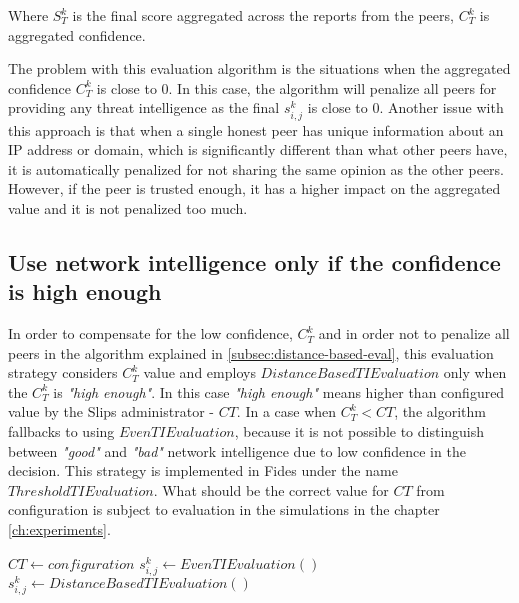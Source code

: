 Where $S^{k}_{T}$ is the final score aggregated across the reports from the peers, $C^{k}_{T}$ is aggregated confidence.

The problem with this evaluation algorithm is the situations when the aggregated confidence $C^{k}_{T}$ is close to $0$. In this case, the algorithm will penalize all peers for providing any threat intelligence as the final $s^{k}_{i, j}$ is close to $0$. Another issue with this approach is that when a single honest peer has unique information about an IP address or domain, which is significantly different than what other peers have, it is automatically penalized for not sharing the same opinion as the other peers. However, if the peer is trusted enough, it has a higher impact on the aggregated value and it is not penalized too much.

\subsection{Use network intelligence only if the confidence is high enough}
\label{subsec:network-intelligence-conf-high-enough}
In order to compensate for the low confidence, $C^{k}_{T}$ and in order not to penalize all peers in the algorithm explained in \ref{subsec:distance-based-eval}, this evaluation strategy considers $C^{k}_{T}$ value and employs  $DistanceBasedTIEvaluation$ only when the  $C^{k}_{T}$ is \textit{"high enough"}. In this case \textit{"high enough"} means higher than configured value by the Slips administrator - ${CT}$.
In a case when  $C^{k}_{T} < {CT}$, the algorithm fallbacks to using $EvenTIEvaluation$, because it is not possible to distinguish between \textit{"good"} and \textit{"bad"} network intelligence due to low confidence in the decision. 
This strategy is implemented in Fides under the name $ThresholdTIEvaluation$.
What should be the correct value for $CT$ from configuration is subject to evaluation in the simulations in the chapter \ref{ch:experiments}.

\begin{algorithm}
\caption{$ThresholdTIEvaluation$}\label{alg:threshold-ti-evaluation}
\begin{algorithmic}[1]
\State ${CT} \gets configuration$ 
	\State $s^{k}_{i, j} \gets EvenTIEvaluation()$
\Else
    \State $s^{k}_{i, j} \gets DistanceBasedTIEvaluation()$
\EndIf
\end{algorithmic}
\end{algorithm}

